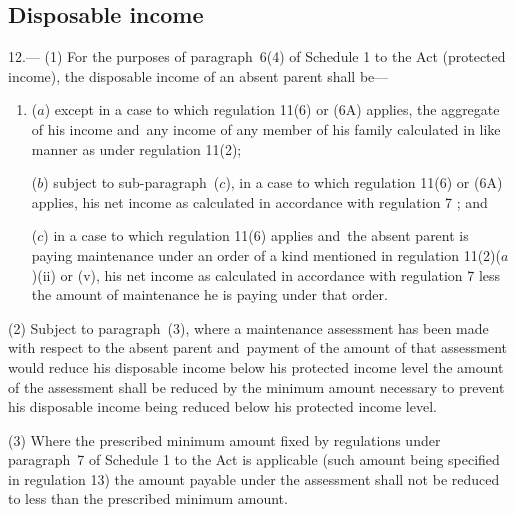 \documentclass[12pt,a4paper]{article}
\begin{document}
\subsection[12. Disposable income]{Disposable income}

12.—%
(1) For the purposes of paragraph~6(4) of Schedule 1 to the Act (protected income), the disposable income of an absent parent shall be—
\begin{enumerate}\item[]
($a$) except in a case to which regulation 11(6) 
or (6A)  %
applies, the aggregate of his income and~any income of any member of his family calculated in like manner as under regulation 11(2); 

($b$) 
subject to sub-paragraph~($c$),  %
in a case to which regulation 11(6) 
or (6A)  %
applies, his net income as calculated in accordance with regulation 7%
; and~ %

($c$) in a case to which regulation 11(6) applies and~the absent parent is paying maintenance under an order of a kind mentioned in regulation 11(2)($a$)(ii) or (v), his net income as calculated in accordance with regulation 7 less the amount of maintenance he is paying under that order.
\end{enumerate}

(2) Subject to paragraph~(3), where a maintenance assessment has been made with respect to the absent parent and~payment of the amount of that assessment would reduce his disposable income below his protected income level the amount of the assessment shall be reduced by the minimum amount necessary to prevent his disposable income being reduced below his protected income level.

(3) Where the prescribed minimum amount fixed by regulations under paragraph~7 of Schedule 1 to the Act is applicable (such amount being specified in regulation 13) the amount payable under the assessment shall not be reduced to less than the prescribed minimum amount.
\end{document}
